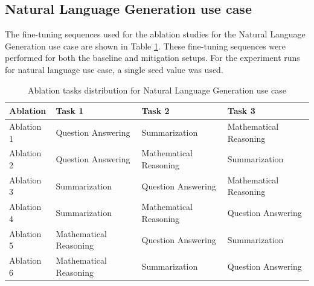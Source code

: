 \subsection{Natural Language Generation use case}
The fine-tuning sequences used for the ablation studies for the Natural Language Generation use case are shown in Table \ref{tab:GenTaskOrder}. These fine-tuning sequences were performed for both the baseline and mitigation setups.
For the experiment runs for natural language use case, a single seed value was used.

\begin{table}[h!]
\centering
\caption{Ablation tasks distribution for Natural Language Generation use case}
\label{tab:GenTaskOrder}
\begin{tabular}{| m{1.8cm} | m{4.5cm} | m{4.5cm} | m{4.5cm} |}
\hline
\textbf{Ablation} & \textbf{Task 1} & \textbf{Task 2} & \textbf{Task 3} \\
\hline
Ablation 1 & Question Answering & Summarization & Mathematical Reasoning \\
\hline
Ablation 2 & Question Answering & Mathematical Reasoning & Summarization \\
\hline
Ablation 3 & Summarization & Question Answering & Mathematical Reasoning \\
\hline
Ablation 4 & Summarization & Mathematical Reasoning & Question Answering \\
\hline
Ablation 5 & Mathematical Reasoning & Question Answering & Summarization \\
\hline
Ablation 6 & Mathematical Reasoning & Summarization & Question Answering \\
\hline
\end{tabular}
\end{table}